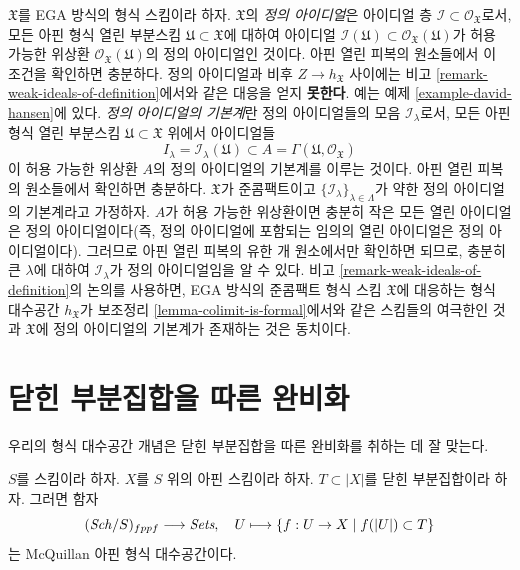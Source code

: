 \begin{remark}[정의 아이디얼]
\label{remark-ideals-of-definition}
$\mathfrak X$를 EGA 방식의 형식 스킴이라 하자. $\mathfrak X$의
{\it 정의 아이디얼}은 아이디얼 층
$\mathcal{I} \subset \mathcal{O}_\mathfrak X$로서, 모든 아핀 형식
열린 부분스킴 $\mathfrak U \subset \mathfrak X$에 대하여 아이디얼
$\mathcal{I}(\mathfrak U) \subset \mathcal{O}_\mathfrak X(\mathfrak U)$가
허용 가능한 위상환 $\mathcal{O}_\mathfrak X(\mathfrak U)$의
정의 아이디얼인 것이다. 아핀 열린 피복의 원소들에서 이 조건을
확인하면 충분하다. 정의 아이디얼과 비후
$Z \to h_\mathfrak X$ 사이에는 비고
\ref{remark-weak-ideals-of-definition}에서와 같은 대응을
얻지 {\bf 못한다}. 예는 예제 \ref{example-david-hansen}에 있다.
{\it 정의 아이디얼의 기본계}란 정의 아이디얼들의 모음
$\mathcal{I}_\lambda$로서, 모든 아핀 형식 열린 부분스킴
$\mathfrak U \subset \mathfrak X$ 위에서 아이디얼들
$$
I_\lambda = \mathcal{I}_\lambda(\mathfrak U) \subset
A = \Gamma(\mathfrak U, \mathcal{O}_\mathfrak X)
$$
이 허용 가능한 위상환 $A$의 정의 아이디얼의 기본계를 이루는
것이다. 아핀 열린 피복의 원소들에서 확인하면 충분하다.
$\mathfrak X$가 준콤팩트이고
$\{\mathcal{I}_\lambda\}_{\lambda \in \Lambda}$가 약한 정의
아이디얼의 기본계라고 가정하자. $A$가 허용 가능한 위상환이면
충분히 작은 모든 열린 아이디얼은 정의 아이디얼이다(즉, 정의
아이디얼에 포함되는 임의의 열린 아이디얼은 정의 아이디얼이다).
그러므로 아핀 열린 피복의 유한 개 원소에서만 확인하면 되므로,
충분히 큰 $\lambda$에 대하여 $\mathcal{I}_\lambda$가 정의
아이디얼임을 알 수 있다. 비고
\ref{remark-weak-ideals-of-definition}의 논의를 사용하면,
EGA 방식의 준콤팩트 형식 스킴 $\mathfrak X$에 대응하는 형식
대수공간 $h_\mathfrak X$가 보조정리
\ref{lemma-colimit-is-formal}에서와 같은 스킴들의 여극한인 것과
$\mathfrak X$에 정의 아이디얼의 기본계가 존재하는 것은 동치이다.
\end{remark}

\section{닫힌 부분집합을 따른 완비화}
\label{section-completion}

\noindent
우리의 형식 대수공간 개념은 닫힌 부분집합을 따른 완비화를 취하는
데 잘 맞는다.

\begin{lemma}
\label{lemma-completion-affine-is-affine-formal-algebraic-space}
$S$를 스킴이라 하자. $X$를 $S$ 위의 아핀 스킴이라 하자.
$T \subset |X|$를 닫힌 부분집합이라 하자. 그러면 함자
$$
(\mathit{Sch}/S)_{fppf} \longrightarrow \textit{Sets},\quad
U \longmapsto \{f : U \to X \mid f(|U|) \subset T\}
$$
는 McQuillan 아핀 형식 대수공간이다.
\end{lemma}

